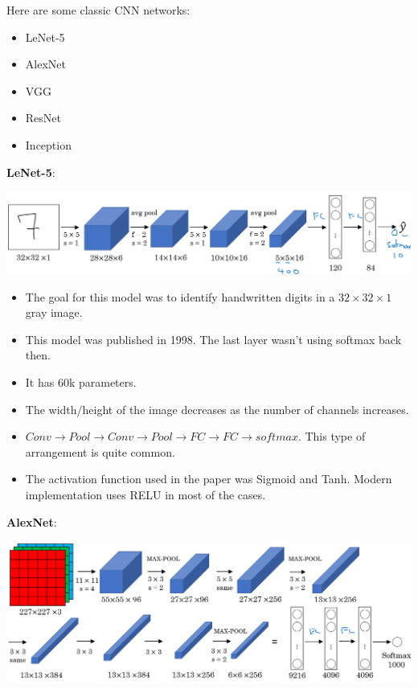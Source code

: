 \documentclass{article}
\begin{document}
\bigskip

\noindent Here are some classic CNN networks:

\begin{itemize}
    \item LeNet-5
    \item AlexNet
    \item VGG
    \item ResNet
    \item Inception
\end{itemize}

\noindent \textbf{LeNet-5}:

\begin{center}
\includegraphics[scale=0.3]{./images/lenet5.png}
\end{center}

\begin{itemize}
    \item The goal for this model was to identify handwritten digits in a \(32 \times 32 \times 1\) gray image.
    \item This model was published in 1998. The last layer wasn't using softmax back then.
    \item It has 60k parameters.
    \item The width/height of the image decreases as the number of channels increases.
    \item \(Conv \longrightarrow Pool \longrightarrow Conv \longrightarrow Pool \longrightarrow FC \longrightarrow FC \longrightarrow softmax\). This type of arrangement is quite common.
    \item The activation function used in the paper was Sigmoid and Tanh. Modern implementation uses RELU in most of the cases.
\end{itemize}

\noindent \textbf{AlexNet}:

\begin{center}
\includegraphics[scale=0.3]{./images/alexnet.png}
\end{center}
\end{document}

